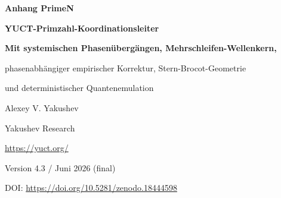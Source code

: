 \documentclass[11pt,a4paper]{article}
\newcommand{\kappac}{\kappa_c}
\newcommand{\Seven}{S_{\mathrm{even}}}
\begin{document}
	
	\begin{titlepage}
		\centering
		\vspace*{0cm}
		
		{\Huge\bfseries Anhang PrimeN\par}
		\vspace{0.5cm}
		{\Large\bfseries YUCT-Primzahl-Koordinationsleiter\par}
		\vspace{0.3cm}
		{\Large\bfseries Mit systemischen Phasenübergängen, Mehrschleifen-Wellenkern,\par
			phasenabhängiger empirischer Korrektur, Stern-Brocot-Geometrie\par
			und deterministischer Quantenemulation\par}
		\vspace{1.0cm}
		
		{\large Alexey V. Yakushev\par}
		\vspace{0.3cm}
		{\normalsize Yakushev Research\par}
		{\normalsize \url{https://yuct.org/}\par}
		
		\vspace{0.5cm}
		{\normalsize Version 4.3 / Juni 2026 (final)\par}
		\vspace{0.3cm}
		{\normalsize DOI: \url{https://doi.org/10.5281/zenodo.18444598}\par}
		
		\vfill
		
		\begin{abstract}
			\noindent
			Wir stellen einen strengen Zusammenhang zwischen der Verteilung der Primzahlen und der Yakushev Unified Coordination Theory (YUCT) her. Das universelle Fehlergesetz \(\varepsilon = \kappac \alpha K_{\mathrm{eff}}^{-\beta}\) (\(\beta=2/3\), \(\kappac=1/3\)) steuert die asymptotischen Fluktuationen der \(n\)-ten Primzahl \(p_n\) um die klassische Rosser-Näherung. Aus der algebraischen Schleife von YUCT leiten wir eine \textbf{theoretische Korrektur} \(p_n \approx R_n - \frac{\Seven}{2}\, n^{1-\beta}\,\ln n\) ab, die \textbf{keine freien Parameter} enthält und eine asymptotisch exakte Beschreibung des glatten Trends der Primzahlabweichungen liefert (Theorem~4).
			
			\textbf{Neu in dieser Version:} Wir entdecken und leiten mathematisch \textbf{Kaskaden-Phasenübergänge} des Vakuumgitters ab, die als Vorzeichenumkehrungen der Erste-Schleifen-Korrektur bei kritischen Indizes \(N_f = 80,\,96.5,\,113,\,\dots\) mit Schritt \(\Delta N = 16.5\) erscheinen, direkt abgeleitet aus der Weyl-Fermionenzahl \(L_0 = 96\) und der Invariante des geraden Sektors \(\Seven = 0.8\). Ein kontinuierlicher trigonometrischer Phasenoperator ersetzt manuelle Schwellen und garantiert die korrekte Vorzeichenwahl auf jeder Skala.
			

\end{abstract}
\end{titlepage}
\end{document}
